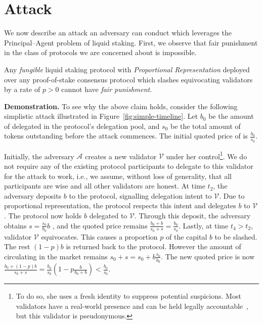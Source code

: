 \section{Attack}\label{sec:attack}

We now describe an attack an adversary can conduct which leverages the
Principal--Agent problem of liquid staking. First, we observe that
fair punishment in the class of protocols we are concerned
about is impossible.

\begin{claim}
Any \emph{fungible} liquid staking protocol with \emph{Proportional Representation}
deployed over any proof-of-stake consensus protocol which slashes equivocating validators by a rate of $p > 0$
cannot have \emph{fair punishment}.
\end{claim}

\noindent
\textbf{Demonstration.}
To see why the above claim holds, consider the following simplistic attack
illustrated in Figure~\ref{fig:simple-timeline}.
Let $b_0$ be the amount of delegated \asset in the protocol's delegation pool,
and $s_0$ be the total amount of \stasset tokens outstanding
before the attack commences. The initial quoted price of \stasset
is $\frac{b_0}{s_0}$.

Initially, the adversary $\mathcal{A}$ creates
a new validator $\mathcal{V}$ under her
control\footnote{To do so, she uses a fresh identity
to suppress potential suspicions. Most validators
have a real-world presence and can be held legally
accountable~\cite[p.~29]{liquid-staking-report}, but this validator is pseudonymous.}.
We do not require any of the existing protocol participants to delegate
to this validator for the attack to work, i.e., we assume, without loss of
generality, that all participants
are wise and all other validators are honest.
At time $t_2$, the adversary deposits $b$ \asset to the protocol,
signalling delegation intent to $\mathcal{V}$.
Due to proportional representation,
the protocol respects this intent and delegates $b$ \asset to $\mathcal{V}$.
The protocol now holds $b$ delegated \asset to $\mathcal{V}$.
Through this deposit, the adversary obtains
$s = \frac{s_0}{b_0} b$ \stasset, and the quoted price remains
$\frac{b_0 + b}{s_0 + s} = \frac{b_0}{s_0}$.
Lastly, at time $t_4 > t_2$, validator
$\mathcal{V}$ equivocates. This causes a proportion $p$ of
the capital $b$ to be slashed.
The rest $(1 - p)b$ \asset is returned back to the protocol.
However the amount of \stasset circulating in the
market remains $s_0 + s = s_0 + b\frac{s_0}{b_0}$.
The new quoted price is now
$\frac{b_0 + (1 - p)b}{s_0 + s} = \frac{b_0}{s_0}(1 - p\frac{b}{b_0 + b}) < \frac{b_0}{s_0}$.


